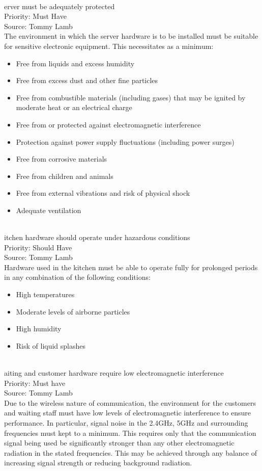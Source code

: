 \documentclass[11pt, a4paper]{report}
\def\itempar#1\\{\item \textbf{#1}\\} %
\begin{document}
\begin{enumerate}[resume*=nonfunctional]
\itempar Server must be adequately protected\\
Priority: Must Have\\
Source: Tommy Lamb\\
The environment in which the server hardware is to be installed must be suitable for sensitive electronic equipment. This necessitates as a minimum:
\begin{itemize}
\item Free from liquids and excess humidity
\item Free from excess dust and other fine particles
\item Free from combustible materials (including gases) that may be ignited by moderate heat or an electrical charge
\item Free from or protected against electromagnetic interference
\item Protection against power supply fluctuations (including power surges)
\item Free from corrosive materials
\item Free from children and animals
\item Free from external vibrations and risk of physical shock
\item Adequate ventilation
\end{itemize}

\itempar Kitchen hardware should operate under hazardous conditions\\
Priority: Should Have\\
Source: Tommy Lamb\\
Hardware used in the kitchen must be able to operate fully for prolonged periods in any combination of the following conditions:
\begin{itemize}
\item High temperatures
\item Moderate levels of airborne particles
\item High humidity
\item Risk of liquid splashes
\end{itemize}

\itempar Waiting and customer hardware require low electromagnetic interference\\
Priority: Must have\\
Source: Tommy Lamb\\
Due to the wireless nature of communication, the environment for the customers and waiting staff must have low levels of electromagnetic interference to ensure performance. In particular, signal noise in the 2.4GHz, 5GHz and surrounding frequencies must kept to a minimum. This requires only that the communication signal being used be significantly stronger than any other electromagnetic radiation in the stated frequencies. This may be achieved through any balance of increasing signal strength or reducing background radiation.

\end{enumerate}
\end{document}
